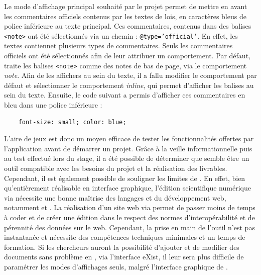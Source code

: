 Le mode d'affichage principal souhaité par le projet permet de mettre en avant les commentaires officiels contenus par les textes de lois, en caractères bleus de police inférieure au texte principal. Ces commentaires, contenus dans des balises \texttt{<note>} ont été sélectionnés via un chemin \xpath : \texttt{@type='official'}. En effet, les textes contiennet plusieurs types de commentaires. Seuls les commentaires officiels ont été sélectionnés afin de leur attribuer un comportement. Par défaut, \tp traite les balises \texttt{<note>} comme des notes de bas de page, via le comportement \textit{note}. Afin de les affichers au sein du texte, il a fallu modifier le comportement par défaut et sélectionner le comportement \textit{inline}, qui permet d'afficher les balises au sein du texte. Ensuite, le code \CSS suivant a permis d'afficher ces commentaires en bleu dans une police inférieure : 

\begin{verbatim}
    font-size: small; color: blue;
\end{verbatim}

L'aire de jeux \tp est donc un moyen efficace de tester les fonctionnalités offertes par l'application avant de démarrer un projet. Grâce à la veille informationnelle puis au test effectué lors du stage, il a été possible de déterminer que \tp semble être un outil compatible avec les besoins du projet et la réalisation des livrables. Cependant, il est également possible de souligner les limites de \tp. En effet, bien qu'entièrement réalisable en interface graphique, l'édition scientifique numérique via \tp nécessite une bonne maîtrise des langages \XML et du développement web, notamment \HTML et \CSS. La réalisation d'un site web via \tp permet de passer moins de temps à coder et de créer une édition dans le respect des normes d'interopérabilité et de pérennité des données sur le web. Cependant, la prise en main de l'outil n'est pas instantanée et nécessite des compétences techniques minimales et un temps de formation. Si les chercheurs auront la possibilité d'ajouter et de modifier des documents sans problème en \XML, via l'interface eXist, il leur sera plus difficile de paramétrer les modes d'affichages seuls, malgré l'interface graphique de \tp. 

